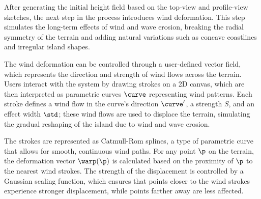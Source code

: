 





After generating the initial height field based on the top-view and profile-view sketches, the next step in the process introduces wind deformation. This step simulates the long-term effects of wind and wave erosion, breaking the radial symmetry of the terrain and adding natural variations such as concave coastlines and irregular island shapes.

The wind deformation can be controlled through a user-defined vector field, which represents the direction and strength of wind flows across the terrain. Users interact with the system by drawing strokes on a 2D canvas, which are then interpreted as parametric curves $\curve$ representing wind patterns. Each stroke defines a wind flow in the curve's direction $\curve'$, a strength $S$, and an effect width $\std$; these wind flows are used to displace the terrain, simulating the gradual reshaping of the island due to wind and wave erosion.

The strokes are represented as Catmull-Rom splines, a type of parametric curve that allows for smooth, continuous wind paths. For any point $\p$ on the terrain, the deformation vector $\warp(\p)$ is calculated based on the proximity of $\p$ to the nearest wind strokes. The strength of the displacement is controlled by a Gaussian scaling function, which ensures that points closer to the wind strokes experience stronger displacement, while points farther away are less affected.


